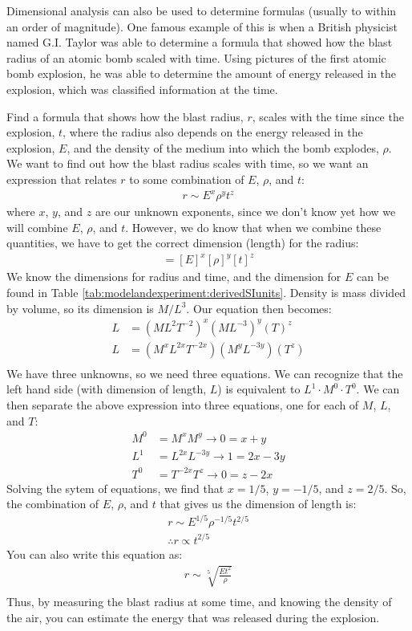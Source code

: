 Dimensional analysis can also be used to determine formulas (usually to within an order of magnitude). One famous example of this is when a British physicist named G.I. Taylor was able to determine a formula that showed how the blast radius of an atomic bomb scaled with time. Using pictures of the first atomic bomb explosion, he was able to determine the amount of energy released in the explosion, which was classified information at the time. 
\newpage
\begin{example}{Find a formula that shows how the blast radius, $r$, scales with the time since the explosion, $t$, where the radius also depends on the energy released in the explosion, $E$, and the density of the medium into which the bomb explodes, $\rho$.} 
We want to find out how the blast radius scales with time, so we want an expression that relates $r$ to some combination of $E$, $\rho$, and $t$:
\begin{align*}
r \sim E^x\rho^y t^z
\end{align*} 
where $x$, $y$, and $z$ are our unknown exponents, since we don't know yet how we will combine $E$, $\rho$, and $t$. However, we do know that when we combine these quantities, we have to get the correct dimension (length) for the radius:
\begin{align*}
[r]=[E]^x[\rho]^y[t]^z
\end{align*}
We know the dimensions for radius and time, and the dimension for $E$ can be found in Table \ref{tab:modelandexperiment:derivedSIunits}. Density is mass divided by volume, so its dimension is $M/L^3$. Our equation then becomes:
\begin{align*}
L&=(ML^2T^{-2})^x(ML^{-3})^y(T)^z\\
L&=(M^xL^{2x}T^{-2x})(M^yL^{-3y})(T^z)\\
\end{align*}
We have three unknowns, so we need three equations. We can recognize that the left hand side (with dimension of length, $L$) is equivalent to $L^1\cdot M^0\cdot T^0$. We can then separate the above expression into three equations, one for each of $M$, $L$, and $T$: 
\begin{align*}
M^0&=M^xM^y \rightarrow 0 = x+y\\
L^1&=L^{2x}L^{-3y} \rightarrow 1=2x-3y\\
T^0&=T^{-2x}T^{z} \rightarrow 0=z-2x
\end{align*}
Solving the sytem of equations, we find that $x=1/5$, $y=-1/5$, and $z=2/5$. 
So, the combination of $E$, $\rho$, and $t$ that gives us the dimension of length is:
\begin{align*}
r\sim E^{1/5}\rho^{-1/5}t^{2/5}\\
\therefore r\propto t^{2/5}
\end{align*}
You can also write this equation as:
\begin{align*}
r\sim \sqrt[5]{\frac{Et^2}{\rho}}\\
\end{align*}
Thus, by measuring the blast radius at some time, and knowing the density of the air, you can estimate the energy that was released during the explosion.
\end{example}

